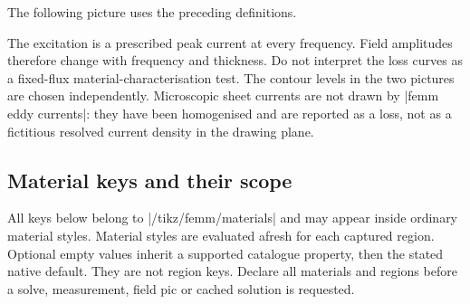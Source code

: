 The following picture uses the preceding definitions.


\begin{codeexample}[width=0pt]
\end{codeexample}


\begin{codeexample}[width=0pt]
\end{codeexample}


The excitation is a prescribed peak current at every frequency. Field amplitudes
therefore change with frequency and thickness. Do not interpret the loss curves
as a fixed-flux material-characterisation test. The contour levels in the two
pictures are chosen independently. Microscopic sheet currents are not drawn by
|femm eddy currents|: they have been homogenised and are reported as a loss,
not as a fictitious resolved current density in the drawing plane.

\subsection{Material keys and their scope}
All keys below belong to |/tikz/femm/materials| and may appear inside ordinary
material styles. Material styles are evaluated afresh for each captured region.
Optional empty values inherit a supported catalogue property, then the stated
native default. They are not region keys. Declare all materials and regions
before a solve, measurement, field pic or cached solution is requested.

